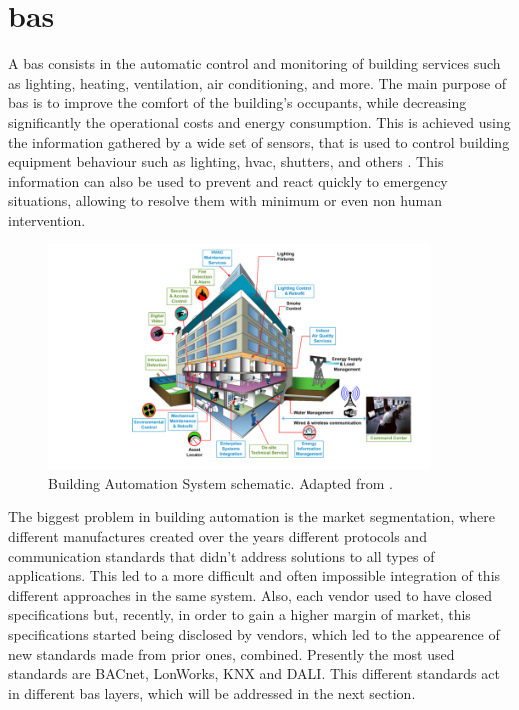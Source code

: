 \section{\acf{bas}}

A \acf{bas} consists in the automatic control and monitoring of building services such as lighting, heating, ventilation, air conditioning, and more. The main purpose of \ac{bas} is to improve the comfort of the building's occupants, while decreasing significantly the operational costs and energy consumption. This is achieved using the information gathered by a wide set of sensors, that is used to control building equipment behaviour such as lighting, \ac{hvac}, shutters, and others \cite{Brambley2005}. This information can also be used to prevent and react quickly to emergency situations, allowing to resolve them with minimum or even non human intervention.

\begin{figure}[H]
	\centering
	\includegraphics[width=0.9\textwidth]{figures/smart-building.jpg}
	\caption{Building Automation System schematic. Adapted from \cite{image-BAS}. }
	\label{fig:smart-building}
\end{figure}

The biggest problem in building automation is the market segmentation, where different manufactures created over the years different protocols and communication standards that didn't address solutions to all types of applications. This led to a more difficult and often impossible integration of this different approaches in the same system. Also, each vendor used to have closed specifications but, recently, in order to gain a higher margin of market, this specifications started being disclosed by vendors, which led to the appearence of new standards made from prior ones, combined. Presently the most used standards are BACnet, LonWorks, KNX and DALI. This different standards act in different \ac{bas} layers, which will be addressed in the next section. 

